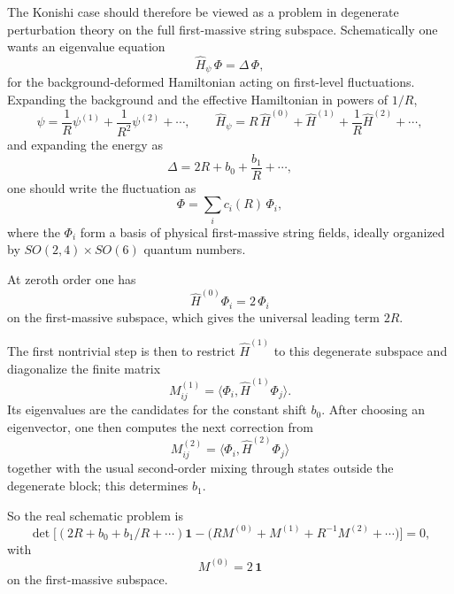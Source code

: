 \documentclass[12pt]{article}
\newcommand{\D}{\Delta}
\begin{document}
The Konishi case should therefore be viewed as a problem in degenerate perturbation theory on the full
first-massive string subspace.  Schematically one wants an eigenvalue equation
\begin{equation}
\widehat H_{\psi}\,\Phi=\D\,\Phi,
\end{equation}
for the background-deformed Hamiltonian acting on first-level fluctuations.  Expanding the background and
the effective Hamiltonian in powers of $1/R$,
\begin{equation}
\psi=\frac{1}{R}\psi^{(1)}+\frac{1}{R^2}\psi^{(2)}+\cdots,
\qquad
\widehat H_{\psi}
=
R\,\widehat H^{(0)}+\widehat H^{(1)}+\frac{1}{R}\widehat H^{(2)}+\cdots,
\end{equation}
and expanding the energy as
\begin{equation}
\D=2R+b_0+\frac{b_1}{R}+\cdots,
\end{equation}
one should write the fluctuation as
\begin{equation}
\Phi=\sum_i c_i(R)\,\Phi_i,
\end{equation}
where the $\Phi_i$ form a basis of physical first-massive string fields, ideally organized by
$SO(2,4)\times SO(6)$ quantum numbers.

At zeroth order one has
\begin{equation}
\widehat H^{(0)}\Phi_i=2\,\Phi_i
\end{equation}
on the first-massive subspace, which gives the universal leading term $2R$.

The first nontrivial step is then to restrict $\widehat H^{(1)}$ to this degenerate subspace and
diagonalize the finite matrix
\begin{equation}
M^{(1)}_{ij}=\langle \Phi_i,\widehat H^{(1)}\Phi_j\rangle.
\end{equation}
Its eigenvalues are the candidates for the constant shift $b_0$.  After choosing an eigenvector, one then
computes the next correction from
\begin{equation}
M^{(2)}_{ij}=\langle \Phi_i,\widehat H^{(2)}\Phi_j\rangle
\end{equation}
together with the usual second-order mixing through states outside the degenerate block; this determines
$b_1$.

So the real schematic problem is
\begin{equation}
\det\!\Big[(2R+b_0+b_1/R+\cdots)\mathbf{1}
-
\big(RM^{(0)}+M^{(1)}+R^{-1}M^{(2)}+\cdots\big)\Big]=0,
\end{equation}
with
\begin{equation}
M^{(0)}=2\,\mathbf{1}
\end{equation}
on the first-massive subspace.
\end{document}
